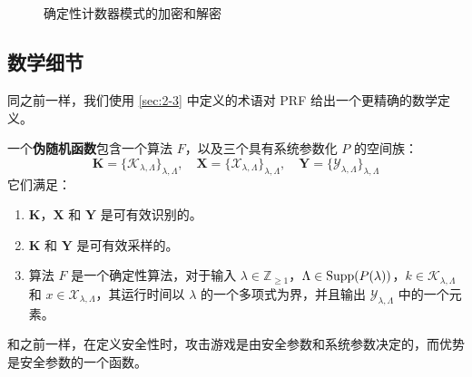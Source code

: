 \begin{figure}
  \centering
  \subfigure[加密]{}
  
  \,
  
  \,
  
  \subfigure[解密]{}
  \caption{确定性计数器模式的加密和解密}
  \label{fig:4-13}
\end{figure}

\subsection{数学细节}

同之前一样，我们使用 \ref{sec:2-3} 中定义的术语对 PRF 给出一个更精确的数学定义。

\begin{definition}[伪随机函数]
一个\textbf{伪随机函数}包含一个算法 $F$，以及三个具有系统参数化 $P$ 的空间族：
\[
\mathbf{K}=\{\mathcal{K}_{\lambda,\Lambda}\}_{\lambda,\Lambda},\quad
\mathbf{X}=\{\mathcal{X}_{\lambda,\Lambda}\}_{\lambda,\Lambda},\quad
\mathbf{Y}=\{\mathcal{Y}_{\lambda,\Lambda}\}_{\lambda,\Lambda}
\]
它们满足：
\begin{enumerate}
	\item $\mathbf{K}$，$\mathbf{X}$ 和 $\mathbf{Y}$ 是可有效识别的。
	\item $\mathbf{K}$ 和 $\mathbf{Y}$ 是可有效采样的。
	\item 算法 $F$ 是一个确定性算法，对于输入 $\lambda\in\mathbb{Z}_{\geq1}$，$\Lambda\in{\rm Supp}(P(\lambda))$，$k\in\mathcal{K}_{\lambda,\Lambda}$ 和 $x\in\mathcal{X}_{\lambda,\Lambda}$，其运行时间以 $\lambda$ 的一个多项式为界，并且输出 $\mathcal{Y}_{\lambda,\Lambda}$ 中的一个元素。
\end{enumerate}
\end{definition}
和之前一样，在定义安全性时，攻击游戏是由安全参数和系统参数决定的，而优势是安全参数的一个函数。